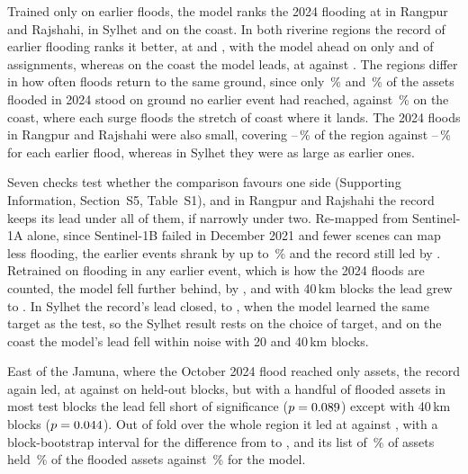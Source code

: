 \documentclass[10pt,a4paper,twocolumn]{article}
\begin{document}
Trained only on earlier floods, the model ranks the 2024 flooding at \RRTempAUC{} in Rangpur and Rajshahi, \SylhetTempAUC{} in Sylhet and \CoastalTempAUC{} on the coast. In both riverine regions the record of earlier flooding ranks it better, at \RRTempPastAUC{} and \SylhetTempPastAUC{}, with the model ahead on only \RRTempAheadPast{} and \SylhetTempAheadPast{} of \RRTempSeeds{} assignments, whereas on the coast the model leads, at \CoastalTempAUC{} against \CoastalTempPastAUC{}. The regions differ in how often floods return to the same ground, since only \RRRollTwentyFourNewGround{}\,\% and \SylhetRollTwentyFourNewGround{}\,\% of the assets flooded in 2024 stood on ground no earlier event had reached, against \CoastalRollTwentyFourNewGround{}\,\% on the coast, where each surge floods the stretch of coast where it lands. The 2024 floods in Rangpur and Rajshahi were also small, covering \RRLateExtentMin{}--\RRLateExtentMax{}\,\% of the region against \RREarlyExtentMin{}--\RREarlyExtentMax{}\,\% for each earlier flood, whereas in Sylhet they were as large as earlier ones.

Seven checks test whether the comparison favours one side (Supporting Information, Section~S5, Table~S1), and in Rangpur and Rajshahi the record keeps its lead under all of them, if narrowly under two. Re-mapped from Sentinel-1A alone, since Sentinel-1B failed in December 2021 and fewer scenes can map less flooding, the earlier events shrank by up to \RRSingleSatShrinkMax{}\,\% and the record still led by \RRSingleSatGap{}. Retrained on flooding in any earlier event, which is how the 2024 floods are counted, the model fell further behind, by \RRTargetAnyGap{}, and with 40\,km blocks the lead grew to \RRBlockFortyTempGap{}. In Sylhet the record's lead closed, to \SylhetTargetAnyGap{}, when the model learned the same target as the test, so the Sylhet result rests on the choice of target, and on the coast the model's lead fell within noise with 20 and 40\,km blocks.

East of the Jamuna, where the October 2024 flood reached only \JamunaPlanAllFlooded{} assets, the record again led, at \JamunaTempPastAUC{} against \JamunaTempAUC{} on held-out blocks, but with a handful of flooded assets in most test blocks the lead fell short of significance ($p=0.089{}$) except with 40\,km blocks ($p=0.044{}$). Out of fold over the whole region it led at \JamunaOofRecordAUC{} against \JamunaOofModelAUC{}, with a block-bootstrap interval for the difference from \JamunaOofGapLow{} to \JamunaOofGapHigh{}, and its list of \JamunaPlanListShare{}\,\% of assets held \JamunaPlanAllRecord{}\,\% of the flooded assets against \JamunaPlanAllModel{}\,\% for the model.
\end{document}

